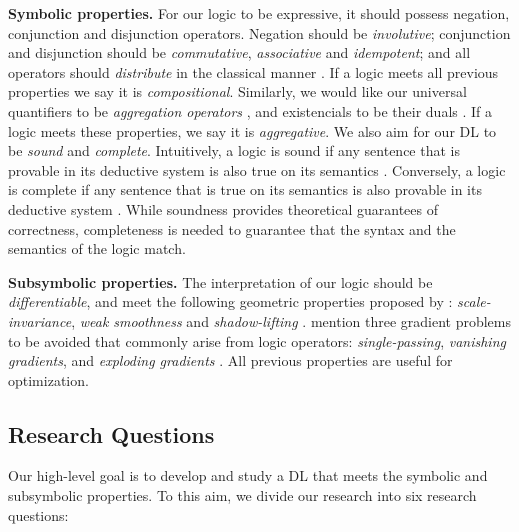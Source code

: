 \textbf{Symbolic properties.} For our logic to be expressive, it should possess negation, conjunction and disjunction operators. Negation should be \emph{involutive}; conjunction and disjunction should be \emph{commutative}, \emph{associative} and \emph{idempotent}; and all operators should \emph{distribute} in the classical manner \citep{galatos2007residuated}. If a logic meets all previous properties we say it is \emph{compositional}. Similarly, we would like our universal quantifiers to be \emph{aggregation operators} \citep{LIU19981}, and existencials to be their duals \citep{LIU19981}. If a logic meets these properties, we say it is \emph{aggregative}.  We also aim for our DL to be \emph{sound} and \emph{complete}. Intuitively, a logic is sound if any sentence that is provable in its deductive system is also true on its semantics \citep{galatos2007residuated}. Conversely, a logic is complete if any sentence that is true on its semantics is also provable in its deductive system \citep{galatos2007residuated}. While soundness provides theoretical guarantees of correctness, completeness is needed to guarantee that the syntax and the semantics of the logic match.

\textbf{Subsymbolic properties.} The interpretation of our logic should be \emph{differentiable}, 
and meet the following geometric properties proposed by \citeauthor{varnai2020robustness}: \emph{scale-invariance}, \emph{weak smoothness} and \emph{shadow-lifting} \citep{varnai2020robustness}. \citeauthor{van2022analyzing} mention three gradient problems to be avoided that commonly arise from logic operators: \emph{single-passing}, \emph{vanishing gradients}, and \emph{exploding gradients} \citep{van2022analyzing}. All previous properties are useful for optimization.  

\subsection{Research Questions}

Our high-level goal is to develop and study a DL that meets the symbolic and subsymbolic properties. To this aim, we divide our research into six research questions:

